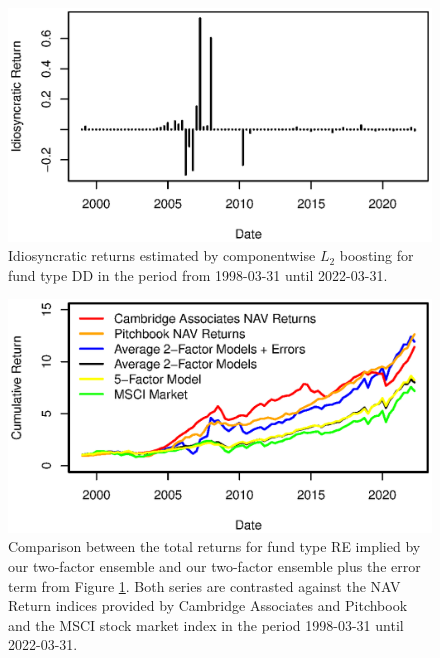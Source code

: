 \begin{figure}[H]
	\centering
	\includegraphics{Figures/XErrorSeriesINF}
	\caption{Idiosyncratic returns estimated by componentwise $L_2$ boosting for fund type DD in the period from 1998-03-31 until 2022-03-31.}
	\label{fig:clb_idio_inf}
\end{figure}

\begin{figure}[H]
	\centering
	\includegraphics{Figures/XTotalErrorSeriesINF}
	\caption{
		Comparison between the total returns for fund type RE implied by our two-factor ensemble and our two-factor ensemble plus the error term from Figure \ref{fig:clb_idio_inf}.
		Both series are contrasted against the NAV Return indices provided by Cambridge Associates and Pitchbook and the MSCI stock market index in the period 1998-03-31 until 2022-03-31.
	}
	\label{fig:clb_total_inf}
\end{figure}

